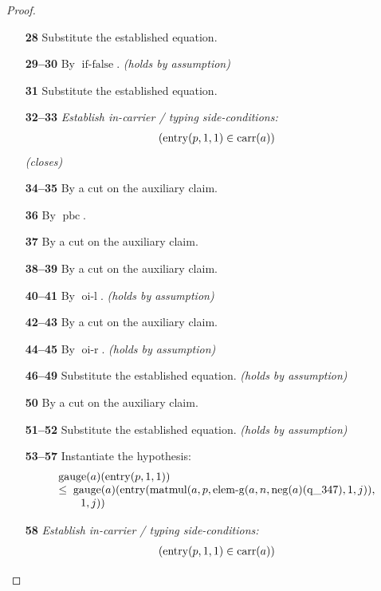 \documentclass[11pt]{article}
\theoremstyle{plain}
\begin{document}
\begin{proof}
\begin{itemize}[leftmargin=2.8em, itemsep=4pt, parsep=1pt]
  \item[\textbf{28}] Substitute the established equation.
  \item[\textbf{29--30}] By $\operatorname{if\text{-}false}$.  \emph{(holds by assumption)}
  \item[\textbf{31}] Substitute the established equation.
  \item[\textbf{32--33}] \emph{Establish in-carrier / typing side-conditions:}
\begin{equation*}
\begin{array}{@{}l@{}}
(\operatorname{entry}(p, 1, 1) \in \operatorname{carr}(a))
\end{array}
\end{equation*}
  \emph{(closes)}
  \item[\textbf{34--35}] By a cut on the auxiliary claim.
  \item[\textbf{36}] By $\operatorname{pbc}$.
  \item[\textbf{37}] By a cut on the auxiliary claim.
  \item[\textbf{38--39}] By a cut on the auxiliary claim.
  \item[\textbf{40--41}] By $\operatorname{oi\text{-}l}$.  \emph{(holds by assumption)}
  \item[\textbf{42--43}] By a cut on the auxiliary claim.
  \item[\textbf{44--45}] By $\operatorname{oi\text{-}r}$.  \emph{(holds by assumption)}
  \item[\textbf{46--49}] Substitute the established equation.  \emph{(holds by assumption)}
  \item[\textbf{50}] By a cut on the auxiliary claim.
  \item[\textbf{51--52}] Substitute the established equation.  \emph{(holds by assumption)}
  \item[\textbf{53--57}] Instantiate the hypothesis:
\begin{equation*}
\begin{array}{@{}l@{}} \operatorname{gauge}(a)(\operatorname{entry}(p, 1, 1)) \\ \leq\; \operatorname{gauge}(a)(\operatorname{entry}(\operatorname{matmul}(a, p, \operatorname{elem\text{-}g}(a, n, \operatorname{neg}(a)(\operatorname{q\_347}), 1, j)), \\ \quad \quad 1, j)) \end{array}
\end{equation*}

  \item[\textbf{58}] \emph{Establish in-carrier / typing side-conditions:}
\begin{equation*}
\begin{array}{@{}l@{}}
(\operatorname{entry}(p, 1, 1) \in \operatorname{carr}(a))
\end{array}
\end{equation*}


\end{itemize}
\end{proof}
\end{document}
